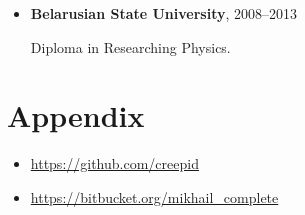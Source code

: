 \documentclass[a4paper, 12pt]{article}
\newcommand{\position}[1]{
    \textbf{#1}}
\begin{document}
    \begin{itemize}

        \item \position{Belarusian State University}, 2008--2013

            Diploma in Researching Physics.

    \end{itemize}

\section*{Appendix}

    \begin{itemize}
        \item \href{https://github.com/creepid}{https://github.com/creepid}
    \end{itemize}
        \begin{itemize}
        \item \href{https://bitbucket.org/mikhail_complete}{https://bitbucket.org/mikhail\_complete}
    \end{itemize}
\end{document}
